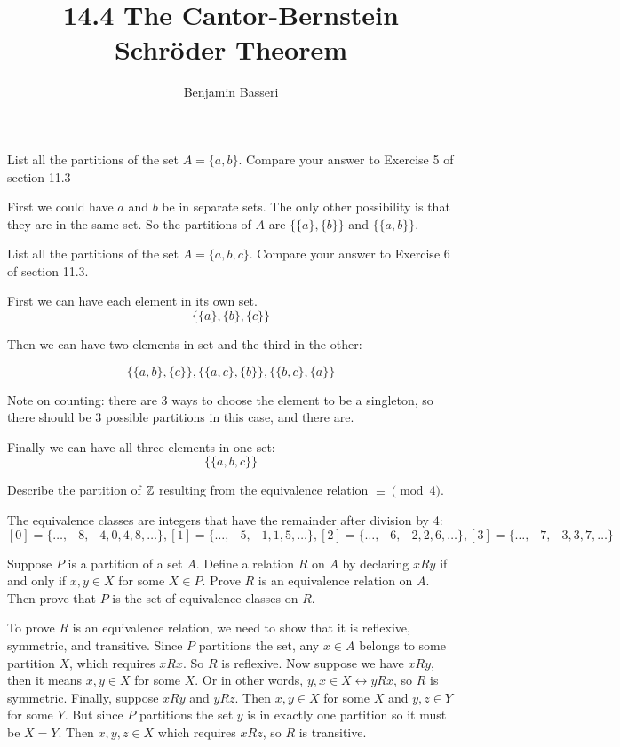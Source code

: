 \documentclass{article}
\title{14.4 The Cantor-Bernstein Schröder Theorem}
\author{Benjamin Basseri}
\date{} %
\begin{document}
\maketitle

\begin{problem}
List all the partitions of the set $A = \{a, b\}$. Compare your answer to Exercise 5 of section 11.3
\end{problem}

First we could have $a$ and $b$ be in separate sets. The only other possibility is that they are in the same set. So the partitions of $A$ are $\{\{a\}, \{b\}\}$ and $\{\{a, b\}\}$.

\begin{problem}
List all the partitions of the set $A = \{a, b, c\}$. Compare your answer to Exercise 6 of section 11.3.
\end{problem}

First we can have each element in its own set.
$$\{\{a\}, \{b\}, \{c\}\}$$

Then we can have two elements in set and the third in the other:

$$\{\{a, b\}, \{c\}\}, \{\{a, c\}, \{b\}\}, \{\{b, c\}, \{a\}\}$$

Note on counting: there are 3 ways to choose the element to be a singleton, so there should be 3 possible partitions in this case, and there are.

Finally we can have all three elements in one set:
$$\{\{a, b, c\}\}$$

\begin{problem}
Describe the partition of $\mathbb{Z}$ resulting from the equivalence relation $\equiv \pmod{4}$.
\end{problem}

The equivalence classes are integers that have the remainder after division by 4:
$$[0] = \{\ldots, -8, -4, 0, 4, 8, \ldots\}, [1] = \{\ldots, -5, -1, 1, 5, \ldots\}, [2] = \{\ldots, -6, -2, 2, 6, \ldots\}, [3] = \{\ldots, -7, -3, 3, 7, \ldots\}$$

\begin{problem}
Suppose $P$ is a partition of a set $A$. Define a relation $R$ on $A$ by declaring $xRy$ if and only if $x, y \in X$ for some $X \in P$. Prove $R$ is an equivalence relation on $A$. Then prove that $P$ is the set of equivalence classes on $R$.
\end{problem}

To prove $R$ is an equivalence relation, we need to show that it is reflexive, symmetric, and transitive. Since $P$ partitions the set, any $x \in A$ belongs to some partition $X$, which requires $xRx$. So $R$ is reflexive. Now suppose we have $xRy$, then it means $x, y \in X$ for some $X$. Or in other words, $y, x \in X \leftrightarrow yRx$, so $R$ is symmetric. Finally, suppose $xRy$ and $yRz$. Then $x, y \in X$ for some $X$ and $y, z \in Y$ for some $Y$. But since $P$ partitions the set $y$ is in exactly one partition so it must be $X = Y$. Then $x, y, z \in X$ which requires $xRz$, so $R$ is transitive.
\end{document}
